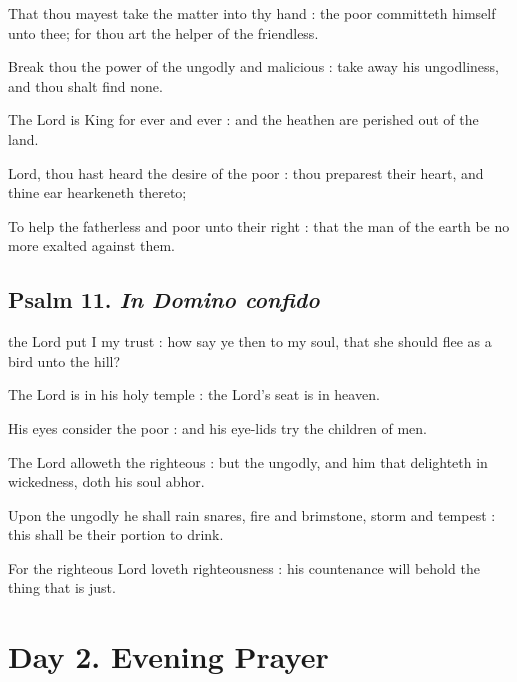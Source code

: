 That thou mayest take the matter into thy hand : the poor committeth himself unto thee; for thou art the helper of the friendless.\par
{}Break thou the power of the ungodly and malicious : take away his ungodliness, and thou shalt find none.\par
{}The Lord is King for ever and ever : and the heathen are perished out of the land.\par
{}Lord, thou hast heard the desire of the poor : thou preparest their heart, and thine ear hearkeneth thereto;\par
{}To help the fatherless and poor unto their right : that the man of the earth be no more exalted against them.\par

\clearpage
\subsection{Psalm 11. \textit{In Domino confido}}

 the Lord put I my trust : how say ye then to my soul, that she should flee as a bird unto the hill?\par
{}
The Lord is in his holy temple : the Lord's seat is in heaven.\par
{}His eyes consider the poor : and his eye-lids try the children of men.\par
{}The Lord alloweth the righteous : but the ungodly, and him that delighteth in wickedness, doth his soul abhor.\par
{}Upon the ungodly he shall rain snares, fire and brimstone, storm and tempest : this shall be their portion to drink.\par
{}For the righteous Lord loveth righteousness : his countenance will behold the thing that is just.\par

\section*{Day 2. Evening Prayer}


